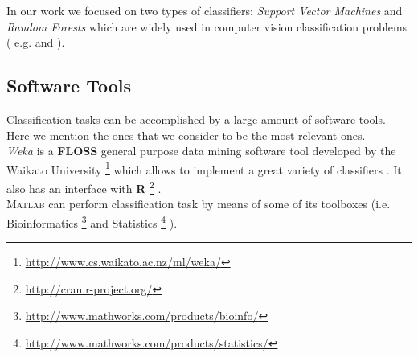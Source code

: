 In our work we focused on two types of classifiers: \textit{Support Vector Machines} and \textit{Random Forests}
which are widely used in computer vision classification problems ( e.g. \cite{mitosisDetectionLearningBased} and \cite{randForests04}).

\subsection{Software Tools}

Classification tasks can be accomplished by a large amount of software tools. Here we mention the ones that we consider to be the most relevant ones.\\
\textit{Weka} \cite{dataMining_Weka, dataMining_Weka_upd} is a \textbf{FLOSS} general purpose data mining software tool developed by the Waikato University
\footnote{\url{http://www.cs.waikato.ac.nz/ml/weka/}} which allows to implement a great variety of classifiers \cite{dataMiningBook}. It also has an interface
with \textbf{R} \footnote{\url{http://cran.r-project.org/}} \cite{hornik2009open}.\\
{\scshape Matlab} can perform classification task by means of some of its toolboxes (i.e. Bioinformatics \footnote{\url{http://www.mathworks.com/products/bioinfo/} }
and Statistics \footnote{\url{http://www.mathworks.com/products/statistics/} } ).


\vspace{0.5cm}

